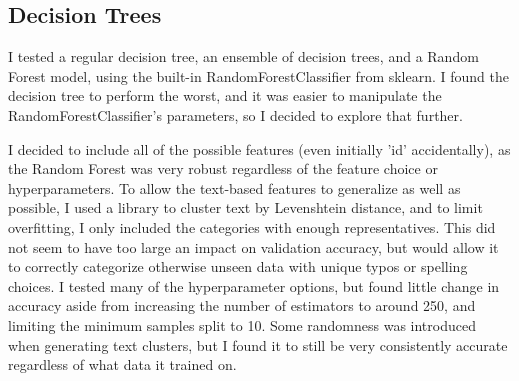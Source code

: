 


\subsection{Decision Trees}
I tested a regular decision tree, an ensemble of decision trees, and a Random Forest model, using the built-in RandomForestClassifier from sklearn. I found the decision tree to perform the worst, and it was easier to manipulate the RandomForestClassifier’s parameters, so I decided to explore that further.

I decided to include all of the possible features (even initially 'id' accidentally), as the Random Forest was very robust regardless of the feature choice or hyperparameters. To allow the text-based features to generalize as well as possible, I used a library to cluster text by Levenshtein distance, and to limit overfitting, I only included the categories with enough representatives. This did not seem to have too large an impact on validation accuracy, but would allow it to correctly categorize otherwise unseen data with unique typos or spelling choices.
I tested many of the hyperparameter options, but found little change in accuracy aside from increasing the number of estimators to around 250, and limiting the minimum samples split to 10. Some randomness was introduced when generating text clusters, but I found it to still be very consistently accurate regardless of what data it trained on.


